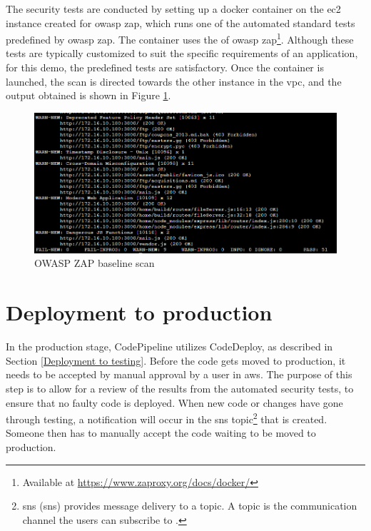 The security tests are conducted by setting up a docker container on the \acrshort{ec2} instance created for \acrshort{owasp} \acrshort{zap}, which runs one of the automated standard tests predefined by \acrshort{owasp} \acrshort{zap}. The container uses the  of \acrshort{owasp} \acrshort{zap}\footnote{Available at \url{https://www.zaproxy.org/docs/docker/}}. Although these tests are typically customized to suit the specific requirements of an application, for this demo, the predefined tests are satisfactory. Once the container is launched, the scan is directed towards the other instance in the \acrshort{vpc}, and the output obtained is shown in Figure \ref{fig: OWASP Zap baseline scan}.

\vspace{2mm}
\begin{figure}[H]
    \centering
    \includegraphics[width=0.8\columnwidth]{Images/owasp-zap-scan.png}
    \caption{OWASP ZAP baseline scan}
    \label{fig: OWASP Zap baseline scan}
\end{figure}


\section{Deployment to production}
In the production stage, CodePipeline utilizes CodeDeploy, as described in Section \ref{Deployment to testing}. Before the code gets moved to production, it needs to be accepted by manual approval by a user in \acrshort{aws}. The purpose of this step is to allow for a review of the results from the automated security tests, to ensure that no faulty code is deployed. When new code or changes have gone through testing, a notification will occur in the \acrshort{sns} topic\footnote{\acrlong{sns} (\acrshort{sns}) provides message delivery to a topic. A topic is the communication channel the users can subscribe to \cite{SNStopic}.} that is created. Someone then has to manually accept the code waiting to be moved to production.

